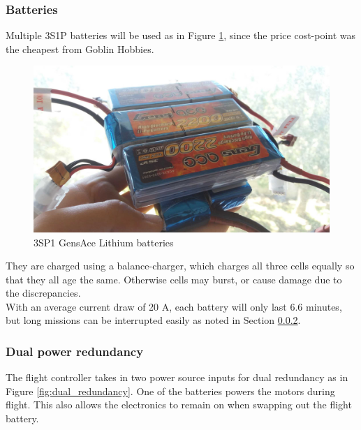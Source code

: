 \subsubsection{Batteries}

Multiple 3S1P batteries will be used as in Figure \ref{fig:batteries}, since the price cost-point was the cheapest from Goblin Hobbies.\\

\begin{figure}[H]
\centering
\includegraphics[scale=0.17]{images/batteries.jpg}
\caption{3SP1 GensAce Lithium batteries}
\label{fig:batteries}
\end{figure}

They are charged using a balance-charger, which charges all three cells equally so that they all age the same. Otherwise cells may burst, or cause damage due to the discrepancies.\\

With an average current draw of 20 A, each battery will only last 6.6 minutes, but long missions can be interrupted easily as noted in Section \ref{sec:dual_power}.

\subsubsection{Dual power redundancy}
\label{sec:dual_power}

The flight controller takes in two power source inputs for dual redundancy as in Figure \ref{fig:dual_redundancy}. One of the batteries powers the motors during flight. This also allows the electronics to remain on when swapping out the flight battery.


